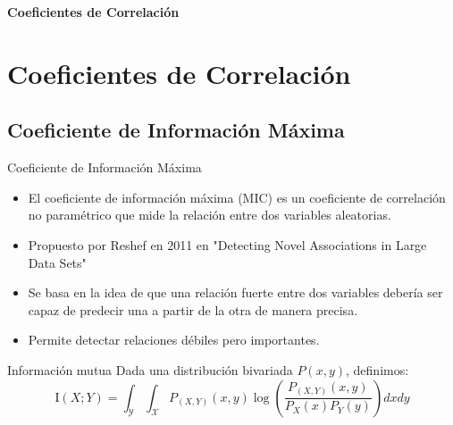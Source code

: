 \documentclass{beamer}
\begin{document}
\begin{frame}
    \begin{center}
        {\LARGE\bf Coeficientes de Correlación}
    \end{center}
\end{frame}

\section{Coeficientes de Correlación}
\subsection{Coeficiente de Información Máxima}
\begin{frame}{Coeficiente de Información Máxima}
    \begin{itemize}
        \item El coeficiente de información máxima (MIC) es un coeficiente de correlación no paramétrico que mide la relación entre dos variables aleatorias.
        \item Propuesto por Reshef en 2011 en "Detecting Novel Associations in Large Data Sets"
        \item Se basa en la idea de que una relación fuerte entre dos variables debería ser capaz de predecir una a partir de la otra de manera precisa.
        \item Permite detectar relaciones débiles pero importantes.
    \end{itemize}
    \begin{block}{Información mutua}
    Dada una distribución bivariada $P(x,y)$, definimos:
        \begin{equation}
            \mathrm{I}(X ; Y)=\int_{\mathcal{Y}} \int_{\mathcal{X}} P_{(X, Y)}(x, y) \log \left(\frac{P_{(X, Y)}(x, y)}{P_{X}(x) P_{Y}(y)}\right)dxdy
        \end{equation}
    \end{block}
\end{frame}
\end{document}
